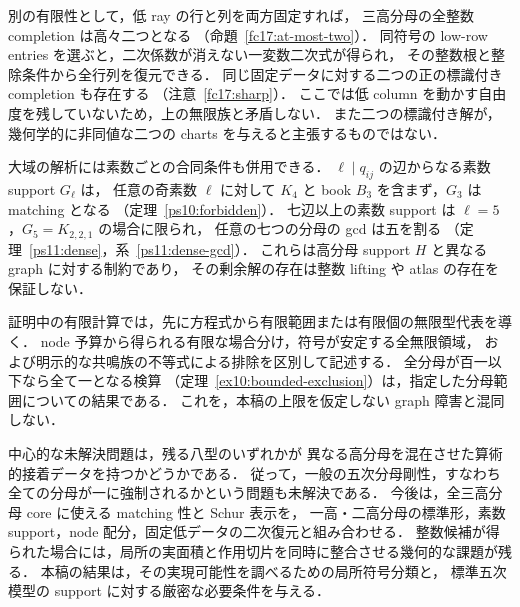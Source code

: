 別の有限性として，低 ray の行と列を両方固定すれば，
三高分母の全整数 completion は高々二つとなる
（命題~\ref{fc17:at-most-two}）．
同符号の low-row entries を選ぶと，二次係数が消えない一変数二次式が得られ，
その整数根と整除条件から全行列を復元できる．
同じ固定データに対する二つの正の標識付き completion も存在する
（注意~\ref{fc17:sharp}）．
ここでは低 column を動かす自由度を残していないため，上の無限族と矛盾しない．
また二つの標識付き解が，幾何学的に非同値な二つの charts を与えると主張するものではない．

大域の解析には素数ごとの合同条件も併用できる．
$\ell\mid q_{ij}$ の辺からなる素数 support $G_\ell$ は，
任意の奇素数 $\ell$ に対して $K_4$ と book $B_3$ を含まず，$G_3$ は matching となる
（定理~\ref{ps10:forbidden}）．
七辺以上の素数 support は $\ell=5$，$G_5=K_{2,2,1}$ の場合に限られ，
任意の七つの分母の gcd は五を割る
（定理~\ref{ps11:dense}，系~\ref{ps11:dense-gcd}）．
これらは高分母 support $H$ と異なる graph に対する制約であり，
その剰余解の存在は整数 lifting や atlas の存在を保証しない．

証明中の有限計算では，先に方程式から有限範囲または有限個の無限型代表を導く．
node 予算から得られる有限な場合分け，符号が安定する全無限領域，
および明示的な共鳴族の不等式による排除を区別して記述する．
全分母が百一以下なら全て一となる検算
（定理~\ref{ex10:bounded-exclusion}）は，指定した分母範囲についての結果である．
これを，本稿の上限を仮定しない graph 障害と混同しない．

中心的な未解決問題は，残る八型のいずれかが
異なる高分母を混在させた算術的接着データを持つかどうかである．
従って，一般の五次分母剛性，すなわち全ての分母が一に強制されるかという問題も未解決である．
今後は，全三高分母 core に使える matching 性と Schur 表示を，
一高・二高分母の標準形，素数 support，node 配分，固定低データの二次復元と組み合わせる．
整数候補が得られた場合には，局所の実面積と作用切片を同時に整合させる幾何的な課題が残る．
本稿の結果は，その実現可能性を調べるための局所符号分類と，
標準五次模型の support に対する厳密な必要条件を与える．
